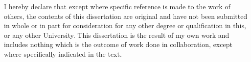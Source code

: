 \begin{declaration}

I hereby declare that except where specific reference is made to the work of others, the contents of this dissertation are original and have not been submitted in whole or in part for consideration for any other degree or qualification in this, or any other University. This dissertation is the result of my own work and includes nothing which is the outcome of work done in collaboration, except where specifically indicated in the text.

\end{declaration}
